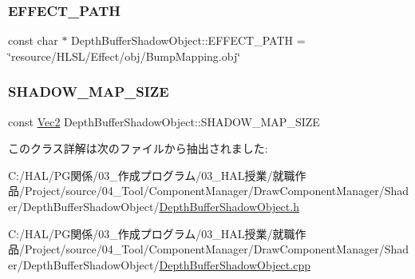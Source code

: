 \subsubsection{\texorpdfstring{E\+F\+F\+E\+C\+T\+\_\+\+P\+A\+TH}{EFFECT\_PATH}}
{\footnotesize\ttfamily const char $\ast$ Depth\+Buffer\+Shadow\+Object\+::\+E\+F\+F\+E\+C\+T\+\_\+\+P\+A\+TH = \char`\"{}resource/H\+L\+SL/Effect/obj/Bump\+Mapping.\+obj\char`\"{}\hspace{0.3cm}{\ttfamily [static]}}

\mbox{\label{class_depth_buffer_shadow_object_aa7a8ac55e3de545dacb0cfde57fd1017}} 
\subsubsection{\texorpdfstring{S\+H\+A\+D\+O\+W\+\_\+\+M\+A\+P\+\_\+\+S\+I\+ZE}{SHADOW\_MAP\_SIZE}}
{\footnotesize\ttfamily const \mbox{\hyperlink{_vector3_d_8h_a5ef6e95dfc5f9d3820b71772d99bbc25}{Vec2}} Depth\+Buffer\+Shadow\+Object\+::\+S\+H\+A\+D\+O\+W\+\_\+\+M\+A\+P\+\_\+\+S\+I\+ZE\hspace{0.3cm}{\ttfamily [static]}}



このクラス詳解は次のファイルから抽出されました\+:\begin{DoxyCompactItemize}
\item 
C\+:/\+H\+A\+L/\+P\+G関係/03\+\_\+作成プログラム/03\+\_\+\+H\+A\+L授業/就職作品/\+Project/source/04\+\_\+\+Tool/\+Component\+Manager/\+Draw\+Component\+Manager/\+Shader/\+Depth\+Buffer\+Shadow\+Object/\mbox{\hyperlink{_depth_buffer_shadow_object_8h}{Depth\+Buffer\+Shadow\+Object.\+h}}\item 
C\+:/\+H\+A\+L/\+P\+G関係/03\+\_\+作成プログラム/03\+\_\+\+H\+A\+L授業/就職作品/\+Project/source/04\+\_\+\+Tool/\+Component\+Manager/\+Draw\+Component\+Manager/\+Shader/\+Depth\+Buffer\+Shadow\+Object/\mbox{\hyperlink{_depth_buffer_shadow_object_8cpp}{Depth\+Buffer\+Shadow\+Object.\+cpp}}\end{DoxyCompactItemize}
